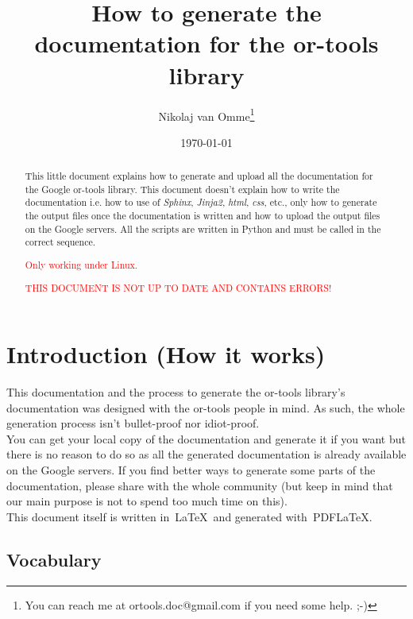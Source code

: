 \documentclass[a4paper,10pt]{article}
\title{How to generate the documentation for the or-tools library}
\author{Nikolaj van Omme\footnote{You can reach me at ortools.doc@gmail.com if you need some help. ;-) }}
\date{\today}
\begin{document}
\maketitle

\begin{abstract}
This little document explains how to generate and upload all the documentation for the Google or-tools library. This document doesn't explain how to write the documentation i.e. how to use of \emph{Sphinx}, \emph{Jinja2}, \emph{html}, \emph{css}, etc., only how to generate the output files once
the documentation is written and how to upload the output files on the Google servers. All the scripts are written in Python and must be called in the correct sequence.\\
\begin{center}\textcolor{red}{Only working under Linux.}\end{center}
\begin{center}\textcolor{red}{THIS DOCUMENT IS NOT UP TO DATE AND CONTAINS ERRORS!}\end{center}
\end{abstract}

\setcounter{tocdepth}{2}
\tableofcontents

\section{Introduction (How it works)}

This documentation and the process to generate the or-tools library's documentation was designed with the or-tools people in mind. As such, the whole generation process isn't bullet-proof nor idiot-proof.\\

You can get your local copy of the documentation and generate it if you want but there is no reason to do so as all the generated documentation is already available on the Google servers. If you find better ways to generate some parts of the documentation, please share with the whole community (but keep in mind that our main purpose is not to spend too much time on this).\\

This document itself is written in~\LaTeX\ and generated with~PDF\LaTeX.

\subsection{Vocabulary}
\end{document}
